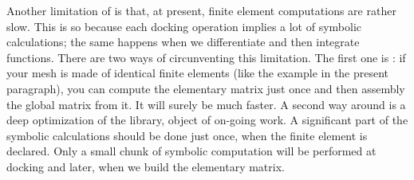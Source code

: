 Another limitation of {\maniFEM} is that, at present, finite element computations
are rather slow.
This is so because each docking operation implies a lot of symbolic calculations;
the same happens when we differentiate and then integrate functions.
There are two ways of circunventing this limitation.
The first one is : if your mesh is made of identical finite elements
(like the example in the present paragraph), you can compute the elementary matrix
just once and then assembly the global matrix from it.
It will surely be much faster.
A second way around is a deep optimization of the {\maniFEM} library,
object of on-going work.
A significant part of the symbolic calculations should be done just once,
when the finite element is declared.
Only a small chunk of symbolic computation will be performed at docking and
later, when we build the elementary matrix.

